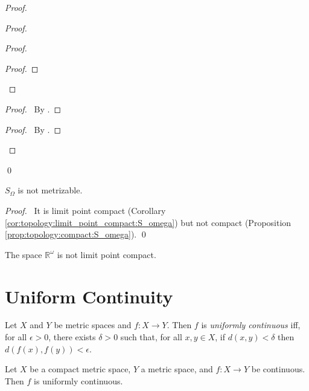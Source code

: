 \begin{proof}
\begin{proof}
\begin{proof}
\begin{proof}
      \end{proof}
    \end{proof}
    \begin{proof}
      \pf\ By .
    \end{proof}
    \begin{proof}
      \pf\ By .
    \end{proof}
  \end{proof}
  \qed
\end{proof}

\begin{cor}
  $S_\Omega$ is not metrizable.
\end{cor}

\begin{proof}
  \pf\ It is limit point compact (Corollary
  \ref{cor:topology:limit_point_compact:S_omega}) but not compact (Proposition
  \ref{prop:topology:compact:S_omega}). \qed
\end{proof}

\begin{cor}
  The space $\mathbb{R}^\omega$ is not limit point compact.
\end{cor}

\section{Uniform Continuity}

\begin{df}
  Let $X$ and $Y$ be metric spaces and $f : X \rightarrow Y$. Then $f$ is
  \emph{uniformly continuous} iff, for all $\epsilon > 0$, there exists
  $\delta > 0$ such that, for all $x, y \in X$, if $d(x, y) < \delta$ then
  $d(f(x), f(y)) < \epsilon$.
\end{df}

\begin{thm}
  Let $X$ be a compact metric space, $Y$ a metric space, and $f : X
  \rightarrow Y$ be continuous. Then $f$ is uniformly continuous.
\end{thm}

